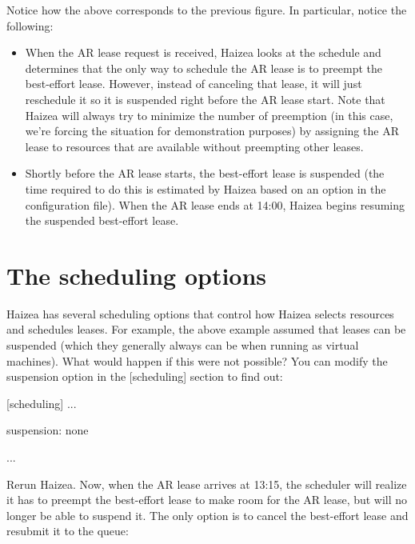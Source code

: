 Notice how the above corresponds to the previous figure. In particular, notice the following:

\begin{itemize}
 \item  When the AR lease request is received, Haizea looks at the schedule and determines that the only way to schedule the AR lease is to preempt the best-effort lease. However, instead of canceling that lease, it will just reschedule it so it is suspended right before the AR lease start. Note that Haizea will always try to minimize the number of preemption (in this case, we're forcing the situation for demonstration purposes) by assigning the AR lease to resources that are available without preempting other leases.
 \item Shortly before the AR lease starts, the best-effort lease is suspended (the time required to do this is estimated by Haizea based on an option in the configuration file). When the AR lease ends at 14:00, Haizea begins resuming the suspended best-effort lease.
\end{itemize}

\section{The scheduling options}

Haizea has several scheduling options that control how Haizea selects resources and schedules leases. For example, the above example assumed that leases can be suspended (which they generally always can be when running as virtual machines). What would happen if this were not possible? You can modify the suspension option in the [scheduling] section to find out:

[scheduling]
...

suspension: none

...

Rerun Haizea. Now, when the AR lease arrives at 13:15, the scheduler will realize it has to preempt the best-effort lease to make room for the AR lease, but will no longer be able to suspend it. The only option is to cancel the best-effort lease and resubmit it to the queue:



